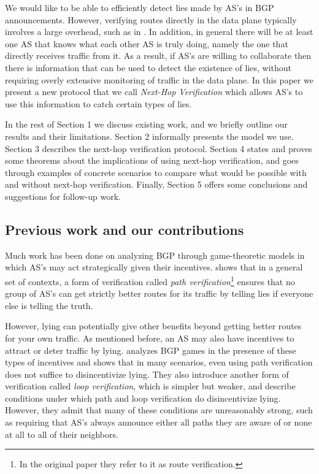 \documentclass[10pt]{article}
\begin{document}
We would like to be able to efficiently detect lies made by AS's in BGP announcements. However, verifying routes directly in the data plane typically involves a large overhead, such as in \cite{DataPlane}. In addition, in general there will be at least one AS that knows what each other AS is truly doing, namely the one that directly receives traffic from it. As a result, if AS's are willing to collaborate then there is information that can be used to detect the existence of lies, without requiring overly extensive monitoring of traffic in the data plane. In this paper we present a new protocol that we call \emph{Next-Hop Verification} which allows AS's to use this information to catch certain types of lies.

In the rest of Section 1 we discuss existing work, and we briefly outline our results and their limitations. Section 2 informally presents the model we use. Section 3 describes the next-hop verification protocol. Section 4 states and proves some theorems about the implications of using next-hop verification, and goes through examples of concrete scenarios to compare what would be possible with and without next-hop verification. Finally, Section 5 offers some conclusions and suggestions for follow-up work.

\subsection{Previous work and our contributions}
Much work has been done on analyzing BGP through game-theoretic models in which AS's may act strategically given their incentives. \cite{RoutingGames} shows that in a general set of contexts, a form of verification called \emph{path verification}\footnote{In the original paper they refer to it as route verification.}
ensures that no group of AS's can get strictly better routes for its traffic by telling lies if everyone else is telling the truth.

However, lying can potentially give other benefits beyond getting better routes for your own traffic. As mentioned before, an AS may also have incentives to attract or deter traffic by lying. \cite{Attraction} analyzes BGP games in the presence of these types of incentives and shows that in many scenarios, even using path verification does not suffice to disincentivize lying. They also introduce another form of verification called \emph{loop verification}, which is simpler but weaker, and describe conditions under which path and loop verification do disincentivize lying. However, they admit that many of these conditions are unreasonably strong, such as requiring that AS's always announce either all paths they are aware of or none at all to all of their neighbors.
\end{document}
